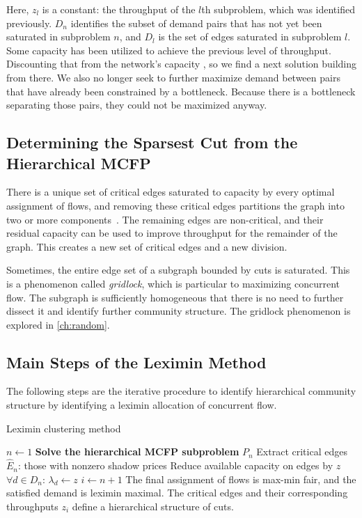 Here, $z_l$ is a constant: the throughput of the $l$th subproblem, which was identified previously. $D_n$ identifies the subset of demand pairs that has not yet been saturated in subproblem $n$, and $D_l$ is the set of edges saturated in subproblem $l$. Some capacity has been utilized to achieve the previous level of throughput. Discounting that from the network's capacity , so we find a next solution building from there. We also no longer seek to further maximize demand between pairs that have already been constrained by a bottleneck. Because there is a bottleneck separating those pairs, they could not be maximized anyway.


\subsection{Determining the Sparsest Cut from the Hierarchical MCFP}

There is a unique set of critical edges saturated to capacity by every optimal assignment of flows, and removing these critical edges partitions the graph into two or more components~\cite{matula1985concurrent}. The remaining edges are non-critical, and their residual capacity can be used to improve throughput for the remainder of the graph. This creates a new set of critical edges and a new division.

Sometimes, the entire edge set of a subgraph bounded by cuts is saturated. This is a phenomenon called \emph{gridlock}, which is particular to maximizing concurrent flow. The subgraph is sufficiently homogeneous that there is no need to further dissect it and identify further community structure. The gridlock phenomenon is explored in \autoref{ch:random}.

\subsection{Main Steps of the Leximin Method}

The following steps are the iterative procedure to identify hierarchical community structure by identifying a leximin allocation of concurrent flow.

\begin{algorithm}
	\caption{Leximin clustering method}
	\label{alg:hmcfp-cc}
		$n \longleftarrow 1$\;
		 {
		    \textbf{Solve the hierarchical MCFP subproblem} $P_n$\;
		    Extract critical edges~$\hat{E}_n$: those with nonzero shadow prices\;
		    Reduce available capacity on edges by $z$\;
		    $\forall d \in D_n$: $\lambda_d \longleftarrow z$ \;
		    $i \longleftarrow n + 1$\;
		}
		The final assignment of flows is max-min fair, and the satisfied demand is leximin maximal. The critical edges and their corresponding throughputs $z_i$ define a hierarchical structure of cuts.
		\vspace{0.25cm}
\end{algorithm}


